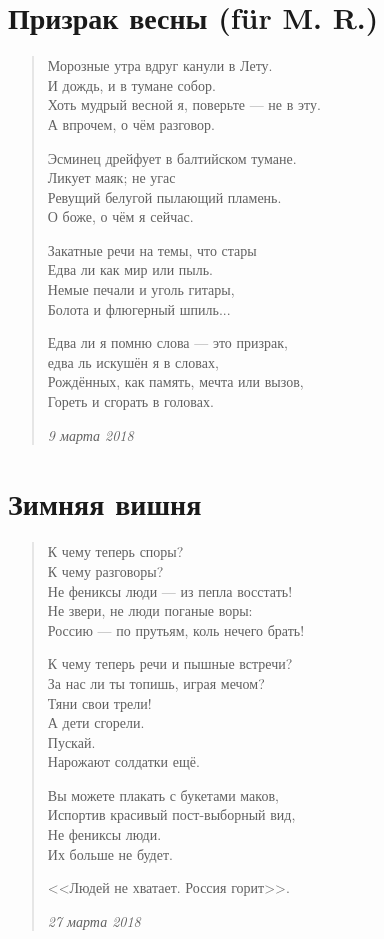 \documentclass[a4paper,12pt,fleqn]{book}\usepackage{polyglossia}\setdefaultlanguage[babelshorthands=true]{russian}\setotherlanguage{english}\defaultfontfeatures{Ligatures=TeX,Mapping=tex-text}\usepackage{xcolor}\newcommand{\ml}[3]{#2}
\begin{document}
\section{Призрак весны (f\"{u}r M. R.)}

\begin{verse}
Морозные утра вдруг канули в Лету.\\
И дождь, и в тумане собор.\\
Хоть мудрый весной я, поверьте --- не в эту.\\
А впрочем, о чём разговор.

Эсминец дрейфует в балтийском тумане.\\
Ликует маяк; не угас\\
Ревущий белугой пылающий пламень.\\
О боже, о чём я сейчас.

Закатные речи на темы, что стары\\
Едва ли как мир или пыль.\\
Немые печали и уголь гитары,\\
Болота и флюгерный шпиль...

Едва ли я помню слова --- это призрак,\\
едва ль искушён я в словах,\\
Рождённых, как память, мечта или вызов,\\
Гореть и сгорать в головах.

\emph{9 марта 2018}
\end{verse}
\newpage

\section{Зимняя вишня}

\begin{verse}

К чему теперь споры?\\
К чему разговоры?\\
Не фениксы люди --- из пепла восстать!\\
Не звери, не люди поганые воры:\\
Россию --- по прутьям, коль нечего брать!

К чему теперь речи и пышные встречи?\\
За нас ли ты топишь, играя мечом?\\
Тяни свои трели!\\
А дети сгорели.\\
Пускай.\\
Нарожают солдатки ещё.

Вы можете плакать с букетами маков,\\
Испортив красивый пост-выборный вид,\\
Не фениксы люди.\\
Их больше не будет.

<<Людей не хватает. Россия горит>>.

\emph{27 марта 2018}
\end{verse}
\newpage
\end{document}
